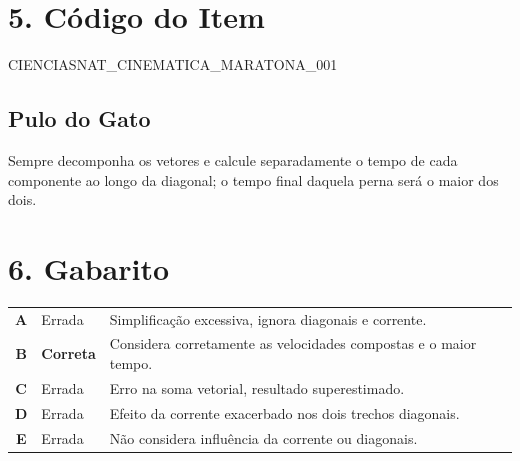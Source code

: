 \documentclass{article}
\begin{document}
\section*{5. Código do Item}
CIENCIASNAT\_CINEMATICA\_MARATONA\_001

\subsection*{Pulo do Gato}
Sempre decomponha os vetores e calcule separadamente o tempo de cada componente ao longo da diagonal; o tempo final daquela perna será o maior dos dois.

\section*{6. Gabarito}
\begin{tabular}{cll}
\textbf{A} & Errada & Simplificação excessiva, ignora diagonais e corrente.\\
\textbf{B} & \textbf{Correta} & Considera corretamente as velocidades compostas e o maior tempo.\\
\textbf{C} & Errada & Erro na soma vetorial, resultado superestimado.\\
\textbf{D} & Errada & Efeito da corrente exacerbado nos dois trechos diagonais.\\
\textbf{E} & Errada & Não considera influência da corrente ou diagonais.
\end{tabular}
\end{document}
